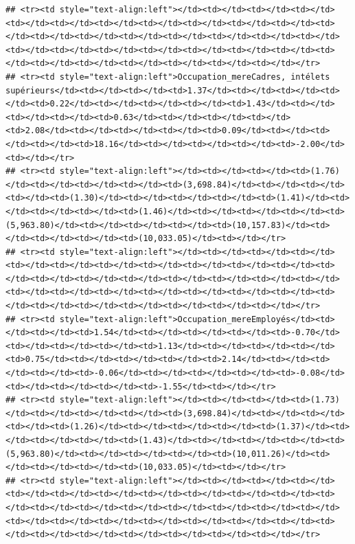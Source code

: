 \documentclass[
]{article}
\begin{document}
\begin{verbatim}
## <tr><td style="text-align:left"></td><td></td><td></td><td></td><td></td><td></td><td></td><td></td><td></td><td></td><td></td><td></td><td></td><td></td><td></td><td></td><td></td><td></td><td></td><td></td><td></td><td></td><td></td><td></td><td></td><td></td><td></td><td></td><td></td><td></td><td></td><td></td><td></td></tr>
## <tr><td style="text-align:left">Occupation_mereCadres, intélets supérieurs</td><td></td><td></td><td>1.37</td><td></td><td></td><td></td><td>0.22</td><td></td><td></td><td></td><td>1.43</td><td></td><td></td><td></td><td>0.63</td><td></td><td></td><td></td><td>2.08</td><td></td><td></td><td></td><td>0.09</td><td></td><td></td><td></td><td>18.16</td><td></td><td></td><td></td><td>-2.00</td><td></td></tr>
## <tr><td style="text-align:left"></td><td></td><td></td><td>(1.76)</td><td></td><td></td><td></td><td>(3,698.84)</td><td></td><td></td><td></td><td>(1.30)</td><td></td><td></td><td></td><td>(1.41)</td><td></td><td></td><td></td><td>(1.46)</td><td></td><td></td><td></td><td>(5,963.80)</td><td></td><td></td><td></td><td>(10,157.83)</td><td></td><td></td><td></td><td>(10,033.05)</td><td></td></tr>
## <tr><td style="text-align:left"></td><td></td><td></td><td></td><td></td><td></td><td></td><td></td><td></td><td></td><td></td><td></td><td></td><td></td><td></td><td></td><td></td><td></td><td></td><td></td><td></td><td></td><td></td><td></td><td></td><td></td><td></td><td></td><td></td><td></td><td></td><td></td><td></td></tr>
## <tr><td style="text-align:left">Occupation_mereEmployés</td><td></td><td></td><td>1.54</td><td></td><td></td><td></td><td>-0.70</td><td></td><td></td><td></td><td>1.13</td><td></td><td></td><td></td><td>0.75</td><td></td><td></td><td></td><td>2.14</td><td></td><td></td><td></td><td>-0.06</td><td></td><td></td><td></td><td>-0.08</td><td></td><td></td><td></td><td>-1.55</td><td></td></tr>
## <tr><td style="text-align:left"></td><td></td><td></td><td>(1.73)</td><td></td><td></td><td></td><td>(3,698.84)</td><td></td><td></td><td></td><td>(1.26)</td><td></td><td></td><td></td><td>(1.37)</td><td></td><td></td><td></td><td>(1.43)</td><td></td><td></td><td></td><td>(5,963.80)</td><td></td><td></td><td></td><td>(10,011.26)</td><td></td><td></td><td></td><td>(10,033.05)</td><td></td></tr>
## <tr><td style="text-align:left"></td><td></td><td></td><td></td><td></td><td></td><td></td><td></td><td></td><td></td><td></td><td></td><td></td><td></td><td></td><td></td><td></td><td></td><td></td><td></td><td></td><td></td><td></td><td></td><td></td><td></td><td></td><td></td><td></td><td></td><td></td><td></td><td></td></tr>

\end{verbatim}
\end{document}
